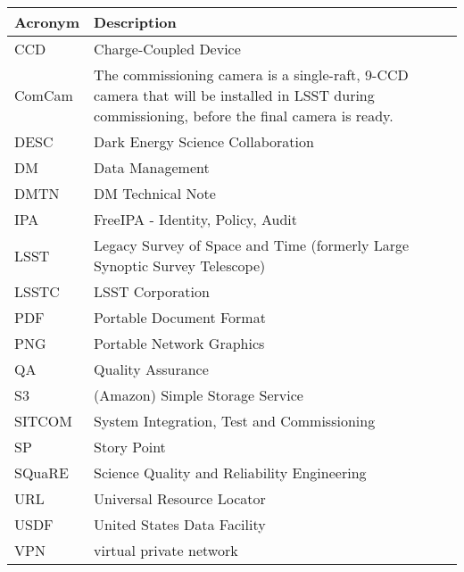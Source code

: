 \addtocounter{table}{-1}
\begin{longtable}{p{}p{}}\hline
\textbf{Acronym} & \textbf{Description}  \\\hline

CCD & Charge-Coupled Device \\\hline
ComCam & The commissioning camera is a single-raft, 9-CCD camera that will be installed in LSST during commissioning, before the final camera is ready. \\\hline
DESC & Dark Energy Science Collaboration \\\hline
DM & Data Management \\\hline
DMTN & DM Technical Note \\\hline
IPA & FreeIPA - Identity, Policy, Audit \\\hline
LSST & Legacy Survey of Space and Time (formerly Large Synoptic Survey Telescope) \\\hline
LSSTC & LSST Corporation \\\hline
PDF & Portable Document Format \\\hline
PNG & Portable Network Graphics \\\hline
QA & Quality Assurance \\\hline
S3 & (Amazon) Simple Storage Service \\\hline
SITCOM & System Integration, Test and Commissioning \\\hline
SP & Story Point \\\hline
SQuaRE & Science Quality and Reliability Engineering \\\hline
URL & Universal Resource Locator \\\hline
USDF & United States Data Facility \\\hline
VPN & virtual private network \\\hline
\end{longtable}

